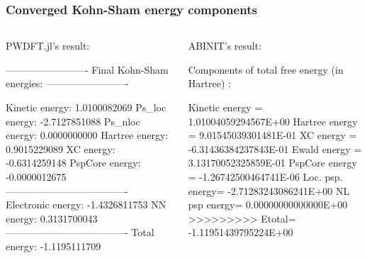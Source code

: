 \begin{frame}[fragile]
\frametitle{Converged Kohn-Sham energy components}

\begin{columns}[T]

\begin{column}{0.45\textwidth}
PWDFT.jl's result:
\begin{textcode}
-------------------------
Final Kohn-Sham energies:
-------------------------

Kinetic    energy:       1.0100082069
Ps_loc     energy:      -2.7127851088
Ps_nloc    energy:       0.0000000000
Hartree    energy:       0.9015229089
XC         energy:      -0.6314259148
PspCore    energy:      -0.0000012675
-------------------------------------
Electronic energy:      -1.4326811753
NN         energy:       0.3131700043
-------------------------------------
Total      energy:      -1.1195111709
\end{textcode}
\end{column}

\begin{column}{0.55\textwidth}

ABINIT's result:
\begin{textcode}
Components of total free energy (in Hartree) :

   Kinetic energy  =  1.01004059294567E+00
   Hartree energy  =  9.01545039301481E-01
   XC energy       = -6.31436384237843E-01
   Ewald energy    =  3.13170052325859E-01
   PspCore energy  = -1.26742500464741E-06
   Loc. psp. energy= -2.71283243086241E+00
   NL   psp  energy=  0.00000000000000E+00
   >>>>>>>>> Etotal= -1.11951439795224E+00
\end{textcode}
\end{column}

\end{columns}

\end{frame}